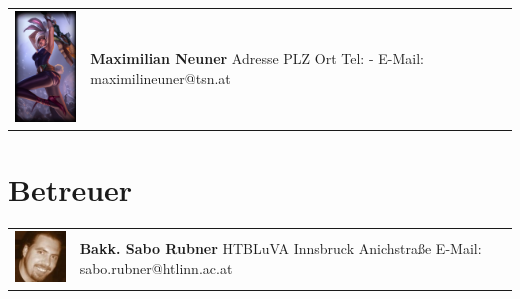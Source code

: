 \begin{tabular}[t]{p{2cm} p{8cm}}
    \vspace{0pt}
    \includegraphics[width=2cm]{../images/maxi.jpg}
    &
    \vspace{0pt}
    \textbf{Maximilian Neuner}
    \newline Adresse
    \newline PLZ Ort
    \newline
    \newline Tel: -
    \newline E-Mail: maximilineuner@tsn.at
    \\
\end{tabular}

\section*{Betreuer}

\begin{tabular}[t]{p{2cm} p{7cm}}
    \vspace{0pt}
    \includegraphics[width=2cm]{../images/sabo.jpg}
    &
    \vspace{0pt}
    \textbf{Bakk. Sabo Rubner}
    \newline HTBLuVA Innsbruck Anichstraße
    \newline
    \newline E-Mail: sabo.rubner@htlinn.ac.at
    \\
\end{tabular}

\newpage